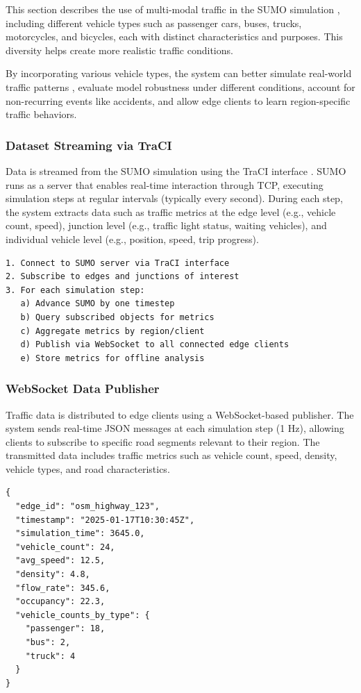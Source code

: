 \documentclass[pdflatex,sn-mathphys-num]{sn-jnl}
\theoremstyle{thmstyleone}
\theoremstyle{thmstyletwo}
\theoremstyle{thmstylethree}
\begin{document}
This section describes the use of multi-modal traffic in the SUMO simulation \cite{lopez2018sumo}, including different vehicle types such as passenger cars, buses, trucks, motorcycles, and bicycles, each with distinct characteristics and purposes. This diversity helps create more realistic traffic conditions.

By incorporating various vehicle types, the system can better simulate real-world traffic patterns \cite{Meng2023LaneChanging}, evaluate model robustness under different conditions, account for non-recurring events like accidents, and allow edge clients to learn region-specific traffic behaviors.

\subsubsection{Dataset Streaming via TraCI}

Data is streamed from the SUMO simulation using the TraCI interface \cite{lopez2018sumo}. SUMO runs as a server that enables real-time interaction through TCP, executing simulation steps at regular intervals (typically every second). During each step, the system extracts data such as traffic metrics at the edge level (e.g., vehicle count, speed), junction level (e.g., traffic light status, waiting vehicles), and individual vehicle level (e.g., position, speed, trip progress).

\begin{verbatim}
1. Connect to SUMO server via TraCI interface
2. Subscribe to edges and junctions of interest
3. For each simulation step:
   a) Advance SUMO by one timestep
   b) Query subscribed objects for metrics
   c) Aggregate metrics by region/client
   d) Publish via WebSocket to all connected edge clients
   e) Store metrics for offline analysis
\end{verbatim}

\subsubsection{WebSocket Data Publisher}

Traffic data is distributed to edge clients using a WebSocket-based publisher. The system sends real-time JSON messages at each simulation step (1 Hz), allowing clients to subscribe to specific road segments relevant to their region. The transmitted data includes traffic metrics such as vehicle count, speed, density, vehicle types, and road characteristics.

\begin{verbatim}
{
  "edge_id": "osm_highway_123",
  "timestamp": "2025-01-17T10:30:45Z",
  "simulation_time": 3645.0,
  "vehicle_count": 24,
  "avg_speed": 12.5,
  "density": 4.8,
  "flow_rate": 345.6,
  "occupancy": 22.3,
  "vehicle_counts_by_type": {
    "passenger": 18,
    "bus": 2,
    "truck": 4
  }
}
\end{verbatim}
\end{document}
